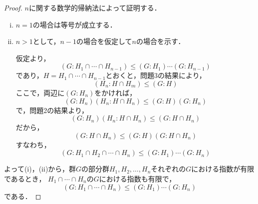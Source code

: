 \documentclass[dvipdfmx,uplatex,11pt]{jsarticle}
\theoremstyle{mytheorem}
\begin{document}
        \begin{leftbar}
            \begin{proof}
                $n$に関する数学的帰納法によって証明する．
                \begin{enumerate}[(i)]
                    \item $n=1$の場合は等号が成立する．
                    \item $n>1$として，$n-1$の場合を仮定して$n$の場合を示す．
                    
                    仮定より，
                    \[
                        (G:H_1 \cap \cdots \cap H_{n-1}) \le (G:H_1) \cdots (G:H_{n-1})
                    \]
                    であり，$H = H_1 \cap \cdots \cap H_{n-1}$とおくと，問題3の結果により，
                    \[
                        (H_n : H \cap H_m) \le (G:H)
                    \]
                    ここで，両辺に$(G:H_n)$をかければ，
                    \[
                        (G:H_n) (H_n:H \cap H_n) \le (G:H) (G:H_n)
                    \]
                    で，問題2の結果より，
                    \[
                        (G:H_n) (H_n:H \cap H_n) \le (G:H \cap H_n)
                    \]
                    だから，
                    \[
                        (G:H \cap H_n)  \le (G:H) (G:H \cap H_n)
                    \]
                    すなわち，
                    \[
                        (G:H_1 \cap H_2 \cap \cdots \cap H_n) \le (G:H_1) \cdots (G:H_n)
                    \]
                \end{enumerate}
                よって(i)，(ii)から，群$G$の部分群$H_1,H_2,\dots,H_n$それぞれの$G$における指数が有限であるとき，
                $H_1  \cap \cdots \cap H_n$の$G$における指数も有限で，
                    \[
                        (G:H_1  \cap \cdots \cap H_n) \le (G:H_1) \cdots (G:H_n)
                    \]
                    である．
            \end{proof}
        \end{leftbar}
        \newpage
\end{document}
